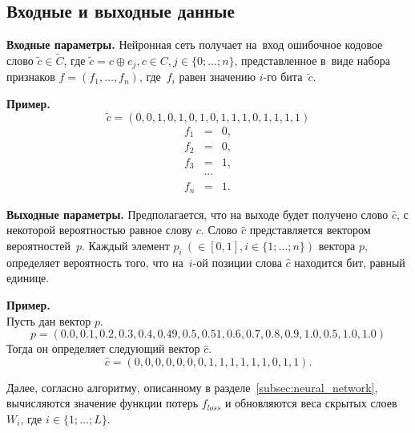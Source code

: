 \subsection{Входные и выходные данные}\label{subsec:input_output}

\textbf{Входные параметры.} Нейронная сеть получает на~вход ошибочное кодовое слово $\widetilde{c} \in \widetilde{C}$,
где $\widetilde{c} = c \oplus e_j, c \in C, j \in \{0;\dots; n\}$,
представленное в~виде набора признаков $f = (f_1, \dots, f_n)$, где~$f_i$ равен значению $i$-го бита~$\widetilde{c}$.

\textbf{Пример.}
\begin{equation}
    \nonumber\widetilde{c} = (0, 0, 1, 0, 1, 0, 1, 0, 1, 1, 1, 0, 1, 1, 1, 1)
\end{equation}
\begin{eqnarray}
    \nonumber f_1 &=& 0, \\
    \nonumber f_2 &=& 0, \\
    \nonumber f_3 &=& 1, \\
    \nonumber &\cdots& \\
    \nonumber f_{n} &=& 1.
\end{eqnarray}

\textbf{Выходные параметры.} Предполагается, что на выходе будет получено слово $\hat{c}$, с некоторой вероятностью равное слову $c$.
Слово $\hat{c}$ представляется вектором вероятностей~$p$. Каждый элемент $p_i~(\in [0, 1], i \in \{1;\dots; n\})$ вектора $p$, определяет вероятность того, что на~$i$-ой позиции слова $\hat{c}$ находится бит, равный единице.

\textbf{Пример.} \\
Пусть дан вектор $p$.
$$p = (0.0, 0.1, 0.2, 0.3, 0.4, 0.49, 0.5, 0.51, 0.6, 0.7, 0.8, 0.9, 1.0, 0.5, 1.0, 1.0)$$
Тогда он определяет следующий вектор $\hat{c}$.
$$\hat{c} = (0, 0, 0, 0, 0, 0, 0, 1, 1, 1, 1, 1, 1, 0, 1, 1).$$

Далее, согласно алгоритму, описанному в разделе~\ref{subsec:neural_network}, вычисляются значение функции потерь $f_{loss}$
и обновляются веса скрытых слоев $W_i$, где $i\in\{1;\dots; L\}$.
